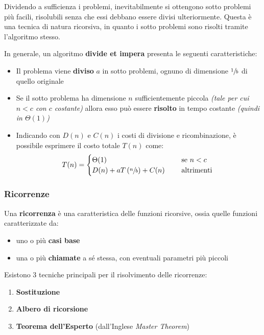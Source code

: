 \documentclass[italian, 10pt]{article}
\begin{document}
Dividendo a sufficienza i problemi, inevitabilmente si ottengono sotto problemi più facili, risolubili senza che essi debbano essere divisi ulteriormente.
Questa è una tecnica di natura ricorsiva, in quanto i sotto problemi sono risolti tramite l'algoritmo stesso.

\bigskip
In generale, un algoritmo \textbf{divide et impera} presenta le seguenti caratteristiche:

\begin{itemize}
  \item Il problema viene \textbf{diviso} \(a\) in sotto problemi, ognuno di dimensione \(\sfrac{1}{b}\) di quello originale
  \item Se il sotto problema ha dimensione \(n\) sufficientemente piccola \textit{(tale per cui \(n < c\) con \(c\) costante)} allora esso può essere \textbf{risolto} in tempo costante \textit{(quindi in \(\Theta(1)\))}
  \item Indicando con \(D(n)\) e \(C(n)\) i costi di divisione e ricombinazione, è possibile esprimere il costo totale \(T(n)\) come:
        \[ T(n) = \begin{cases} \Theta(1)                                 & \quad \text{ se } n < c   \\
              D(n) + aT\left(\sfrac{n}{b}\right) + C(n) & \quad \text{ altrimenti }
          \end{cases}\]
\end{itemize}

\subsubsection{Ricorrenze}

Una \textbf{ricorrenza} è una caratteristica delle funzioni ricorsive, ossia quelle funzioni caratterizzate da:

\begin{itemize}
  \item uno o più \textbf{casi base}
  \item una o più \textbf{chiamate} a sé stessa, con eventuali parametri più piccoli
\end{itemize}

Esistono \(3\) tecniche principali per il risolvimento delle ricorrenze:

\begin{enumerate}
  \item \textbf{Sostituzione}
  \item \textbf{Albero di ricorsione}
  \item \textbf{Teorema dell'Esperto} (dall'Inglese \textit{Master Theorem})
\end{enumerate}
\end{document}
